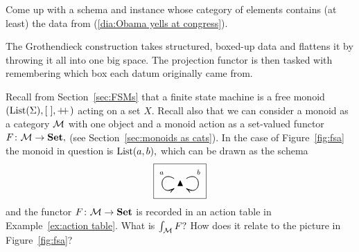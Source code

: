 \documentclass[CT4S-EN-RU]{subfiles}
\begin{document}
\begin{applicationRUS}
\end{applicationRUS}

\begin{exerciseENG}
Come up with a schema and instance whose category of elements contains (at least) the data from (\ref{dia:Obama yells at congress}).
\end{exerciseENG}

\begin{exerciseRUS}
\end{exerciseRUS}

\begin{sloganENG}
The Grothendieck construction takes structured, boxed-up data and flattens it by throwing it all into one big space. The projection functor is then tasked with remembering which box each datum originally came from.
\end{sloganENG}

\begin{sloganRUS}
\end{sloganRUS}

\begin{exerciseENG}\label{exc:FSM as elements of monoid action}
Recall from Section~\ref{sec:FSMs} that a finite state machine is a free monoid $(\textnormal{List}(\Sigma),[\;],+\!\!+\hspace{1pt})$ acting on a set $X.$ Recall also that we can consider a monoid as a category $\mathcal{M}$ with one object and a monoid action as a set-valued functor $F\colon\mathcal{M}\rightarrow{\mathbf{Set}},$ (see Section~\ref{sec:monoids as cats}). In the case of Figure~\ref{fig:fsa} the monoid in question is $\textnormal{List}(a,b),$ which can be drawn as the schema
$$\fbox{\xymatrix{\monOb\ar@(ul,dl)[]_(.3)a\ar@(ul,dl)[]_(.7){~}\ar@(ur,dr)[]^(.3)b\ar@(ur,dr)[]^(.7){~}}}$$
and the functor $F\colon\mathcal{M}\rightarrow{\mathbf{Set}}$ is recorded in an action table in Example~\ref{ex:action table}. What is $\int_\mathcal{M} F?$ How does it relate to the picture in Figure~\ref{fig:fsa}?
\end{exerciseENG}

\begin{exerciseRUS}\label{exc:FSM as elements of monoid action}
\end{exerciseRUS}


\subsection{}
\end{document}
